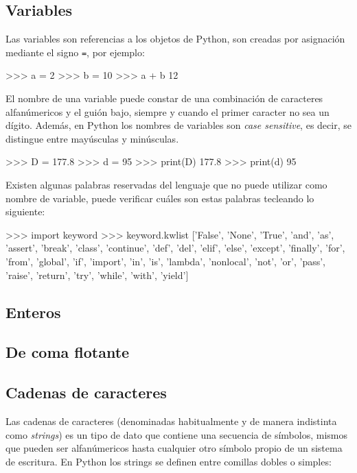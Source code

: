 \subsection{Variables}

Las variables son referencias a los objetos de Python, son creadas por asignación mediante el signo \texttt{=}, 
por ejemplo:

\begin{python}
>>> a = 2
>>> b = 10
>>> a + b
12
\end{python}

El nombre de una variable puede constar de una combinación de caracteres alfanúmericos y el guión bajo, 
siempre y cuando el primer caracter no sea un dígito. Además, en Python los nombres de variables son 
\textit{case sensitive}, es decir, se distingue entre mayúsculas y minúsculas.

\begin{python}
>>> D = 177.8
>>> d = 95
>>> print(D)
177.8
>>> print(d)
95
\end{python}

Existen algunas palabras reservadas del lenguaje que no puede utilizar como nombre de variable, 
puede verificar cuáles son estas palabras tecleando lo siguiente:

\begin{python}
>>> import keyword
>>> keyword.kwlist
['False', 'None', 'True', 'and', 'as', 'assert', 'break', 'class', 'continue', 'def', 'del', 'elif', 'else', 'except', 'finally', 'for', 'from', 'global', 'if', 'import', 'in', 'is', 'lambda', 'nonlocal', 'not', 'or', 'pass', 'raise', 'return', 'try', 'while', 'with', 'yield']
\end{python}


\subsection{Enteros}



\subsection{De coma flotante}



\subsection{Cadenas de caracteres}

Las cadenas de caracteres (denominadas habitualmente y de manera indistinta como \textit{strings}) es un tipo de dato 
que contiene una secuencia de símbolos, mismos que pueden ser alfanúmericos hasta cualquier otro símbolo propio de 
un sistema de escritura. En Python los strings se definen entre comillas dobles o simples:

